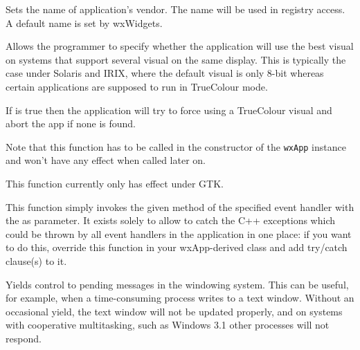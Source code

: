 \label{wxappsetvendorname}


Sets the name of application's vendor. The name will be used
in registry access. A default name is set by
wxWidgets.




\label{wxappsetusebestvisual}


Allows the programmer to specify whether the application will use the best visual
on systems that support several visual on the same display. This is typically the
case under Solaris and IRIX, where the default visual is only 8-bit whereas certain
applications are supposed to run in TrueColour mode.

If  is true then the application will try to force
using a TrueColour visual and abort the app if none is found.

Note that this function has to be called in the constructor of the {\tt wxApp} 
instance and won't have any effect when called later on.

This function currently only has effect under GTK.




\label{wxapphandleevent}


This function simply invokes the given method  of the specified
event handler  with the  as parameter. It exists solely
to allow to catch the C++ exceptions which could be thrown by all event
handlers in the application in one place: if you want to do this, override this
function in your wxApp-derived class and add try/catch clause(s) to it.


\label{wxappyield}


Yields control to pending messages in the windowing system. This can be useful, for example, when a
time-consuming process writes to a text window. Without an occasional
yield, the text window will not be updated properly, and on systems with
cooperative multitasking, such as Windows 3.1 other processes will not respond.

